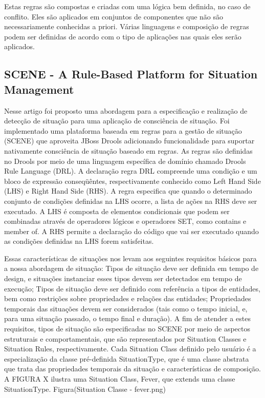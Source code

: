 \documentclass[12pt,a4paper,compsoc]{IEEEtran}
\begin{document}
Estas regras são compostas e criadas com uma lógica bem definida, no caso de conflito. Eles são aplicados em conjuntos de componentes que não são necessariamente conhecidas a priori. Várias linguagens e composição de regras podem ser definidas de acordo com o tipo de aplicações nas quais eles serão aplicados.


\subsection{SCENE - A Rule-Based Platform for Situation Management}

Nesse artigo foi proposto uma abordagem para a especificação e realização de detecção de situação para uma aplicação de consciência de situação. Foi implementado uma plataforma baseada em regras para a gestão de situação (SCENE) que aproveita JBoss Drools adicionando funcionalidade para suportar nativamente consciência de situação baseado em regras.
As regras são definidas no Drools por meio de uma linguagem específica de domínio chamado Drools Rule Language (DRL). A declaração regra DRL compreende uma condição e um bloco de expressão conseqüêntes, respectivamente conhecido como  Left Hand Side (LHS) e Right Hand Side (RHS). A regra especifica que quando o determinado conjunto de condições definidas na LHS ocorre, a lista de ações na RHS deve ser executado. A LHS é composta de elementos condicionais que podem ser combinadas através de operadores lógicos e operadores SET, como  contains e member of. A RHS permite a declaração do código que vai ser executado quando as condições definidas na LHS forem satisfeitas.

Essas características de situações nos levam aos seguintes requisitos básicos para a nossa abordagem de situação:
Tipos de situação deve ser definida em tempo de design, e situações instanciar esses tipos devem ser detectados em tempo de execução; 
Tipos de situação deve ser definido com referência a tipos de entidades, bem como restrições sobre propriedades e relações das entidades;
Propriedades temporais das situações devem ser considerados (tais como o tempo inicial, e, para uma situação passado, o tempo final e duração).
A fim de atender a estes requisitos, tipos de situação são especificadas no SCENE por meio de aspectos estruturais e comportamentais, que são representados por  Situation Classes e Situation Rules, respectivamente. Cada Situation Class definido pelo usuário é a especialização da classe pré-definida SituationType, que é uma classe abstrata que trata das propriedades temporais da situação e características de composição. A FIGURA X ilustra uma Situation Class, Fever, que extends uma classe SituationType.
Figura(Situation Classe - fever.png)
\end{document}
